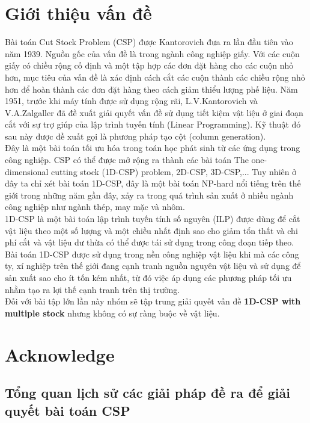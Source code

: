 \documentclass[a4paper]{article}
\begin{document}
\section{Giới thiệu vấn đề}

\indent\indent Bài toán Cut Stock Problem (CSP) được Kantorovich đưa ra lần đầu tiên vào năm 1939. Nguồn gốc của vấn đề là trong ngành công nghiệp giấy. Với các cuộn giấy có chiều rộng cố định và một tập hợp các đơn đặt hàng cho các cuộn nhỏ hơn, mục tiêu của vấn đề là xác định cách cắt các cuộn thành các chiều rộng nhỏ hơn để hoàn thành các đơn đặt hàng theo cách giảm thiểu lượng phế liệu. Năm 1951, trước khi máy tính được sử dụng rộng rãi, L.V.Kantorovich và V.A.Zalgaller đã đề xuất giải quyết vấn đề sử dụng tiết kiệm vật liệu ở giai đoạn cắt với sự trợ giúp của lập trình tuyến tính (Linear Programming). Kỹ thuật đó sau này được đề xuất gọi là phương pháp tạo cột (column generation). \\
\indent Đây là một bài toán tối ưu hóa trong toán học phát sinh từ các ứng dụng trong công nghiệp. CSP có thể được mở rộng ra thành các bài toán The one-dimensional cutting stock (1D-CSP) problem, 2D-CSP, 3D-CSP,... Tuy nhiên ở đây ta chỉ xét bài toán 1D-CSP, đây là một bài toán NP-hard nổi tiếng trên thế giới trong những năm gần đây, xảy ra trong quá trình sản xuất ở nhiều ngành công nghiệp như ngành thép, may mặc và nhôm. \\
\indent 1D-CSP là một bài toán lập trình tuyến tính số nguyên (ILP) được dùng để cắt vật liệu theo một số lượng và một chiều nhất định sao cho giảm tổn thất và chi phí cắt và vật liệu dư thừa có thể được tái sử dụng trong công đoạn tiếp theo. Bài toán 1D-CSP được sử dụng trong nền công nghiệp vật liệu khi mà các công ty, xí nghiệp trên thế giới đang cạnh tranh nguồn nguyên vật liệu và sử dụng để sản xuất sao cho ít tốn kém nhất, từ đó việc áp dụng các phương pháp tối ưu nhằm tạo ra lợi thế cạnh tranh trên thị trường.\\
\indent Đối với bài tập lớn lần này nhóm sẽ tập trung giải quyết vấn đề \textbf{1D-CSP with multiple stock} nhưng không có sự ràng buộc về vật liệu. 

\section{Acknowledge}
\subsection{Tổng quan lịch sử các giải pháp đề ra để giải quyết bài toán CSP}
\end{document}
